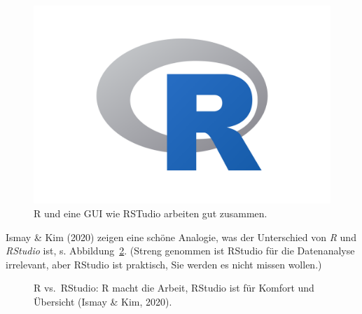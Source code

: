 \documentclass[
  a4paper,
]{scrbook}
\theoremstyle{definition}
\theoremstyle{definition}
\theoremstyle{definition}
\theoremstyle{remark}
\begin{document}
\begin{figure}
\begin{minipage}{0.20\linewidth}
\end{minipage}%
%
\begin{minipage}{0.40\linewidth}

\includegraphics{img/rlogo.png}

\end{minipage}%

\caption{\label{fig-rlove}R und eine GUI wie RSTudio arbeiten gut
zusammen.}

\end{figure}%

Ismay \& Kim (2020) zeigen eine schöne Analogie, was der Unterschied von
\emph{R} und \emph{RStudio} ist, s. Abbildung~\ref{fig-r-rstudio}.
(Streng genommen ist RStudio für die Datenanalyse irrelevant, aber
RStudio ist praktisch, Sie werden es nicht missen wollen.)

\begin{figure}


\caption{\label{fig-r-rstudio}R vs.~RStudio: R macht die Arbeit, RStudio
ist für Komfort und Übersicht (Ismay \& Kim, 2020).}

\end{figure}%
\end{document}
